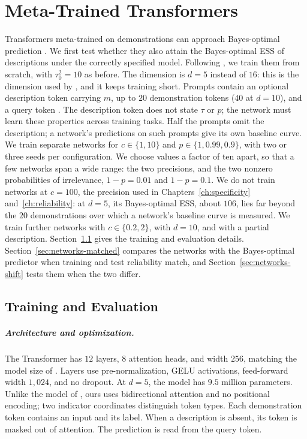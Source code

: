 \chapter{Meta-Trained Transformers}\label{ch:networks}

Transformers meta-trained on demonstrations can approach Bayes-optimal prediction \citep{garg2022,genewein2025}. We first test whether they also attain the Bayes-optimal ESS of descriptions under the correctly specified model. Following \citet{garg2022}, we train them from scratch, with $\tau_0^2=10$ as before. The dimension is $d=5$ instead of $16$: this is the dimension used by \citet{huangge2025}, and it keeps training short. Prompts contain an optional description token carrying $m$, up to $20$ demonstration tokens ($40$ at $d=10$), and a query token \citep{huangge2025}. The description token does not state $\tau$ or $p$; the network must learn these properties across training tasks. Half the prompts omit the description; a network's predictions on such prompts give its own baseline curve. We train separate networks for $c\in\{1,10\}$ and $p\in\{1,0.99,0.9\}$, with two or three seeds per configuration. We choose values a factor of ten apart, so that a few networks span a wide range: the two precisions, and the two nonzero probabilities of irrelevance, $1-p=0.01$ and $1-p=0.1$. We do not train networks at $c=100$, the precision used in Chapters~\ref{ch:specificity} and~\ref{ch:reliability}: at $d=5$, its Bayes-optimal ESS, about $106$, lies far beyond the $20$ demonstrations over which a network's baseline curve is measured. We train further networks with $c\in\{0.2,2\}$, with $d=10$, and with a partial description. Section~\ref{app:networks} gives the training and evaluation details. Section~\ref{sec:networks-matched} compares the networks with the Bayes-optimal predictor when training and test reliability match, and Section~\ref{sec:networks-shift} tests them when the two differ.

\section{Training and Evaluation}\label{app:networks}

\paragraph{Architecture and optimization.}
The Transformer has $12$ layers, $8$ attention heads, and width $256$, matching the model size of \citet{garg2022}. Layers use pre-normalization, GELU activations, feed-forward width $1{,}024$, and no dropout. At $d = 5$, the model has $9.5$ million parameters. Unlike the model of \citet{garg2022}, ours uses bidirectional attention and no positional encoding; two indicator coordinates distinguish token types. Each demonstration token contains an input and its label. When a description is absent, its token is masked out of attention. The prediction is read from the query token.


